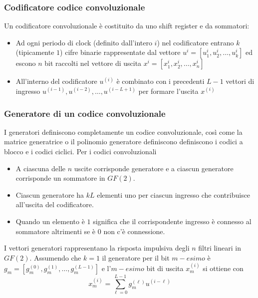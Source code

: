         \subsubsection{Codificatore codice convoluzionale}
            Un codificatore convoluzionale è costituito da uno shift register e da sommatori: 
            \begin{itemize}
                \item {
                    \begin{sloppypar}
                        Ad ogni periodo di clock (definito dall'intero $i$) nel codificatore entrano $k$ (tipicamente $1$) cifre binarie 
                        rappresentate dal vettore ${u^{i} = [u^{i}_1,u^{i}_2,\dots,u^{i}_k]}$ ed escono $n$ bit raccolti nel vettore di uscita
                        ${x^{i} = [x^{i}_1,x^{i}_2,\dots,x^{i}_n]}$
                    \end{sloppypar}
                }
                \item {
                    All'interno del codificatore $u^{(i)}$ è combinato con i precedenti $L-1$ vettori di ingresso $u^{(i-1)},u^{(i-2)},\dots,u^{(i-L+1)}$
                    per formare l'uscita $x^{(i)}$
                }
            \end{itemize}
        \subsubsection{Generatore di un codice convoluzionale}
            I generatori definiscono completamente un codice convoluzionale, così come la matrice generatrice o il polinomio generatore definiscono
            definiscono i codici a blocco e i codici ciclici. Per i codici convoluzionali 
            \begin{itemize}
                \item {
                    A ciascuna delle $n$ uscite corrisponde generatore e a ciascun generatore corrisponde un sommatore in $GF(2)$.
                }
                \item {
                    Ciascun generatore ha $kL$ elementi uno per ciascun ingresso che contribuisce all'uscita del codificatore.
                }
                \item {
                    Quando un elemento è $1$ significa che il corrispondente ingresso è connesso al sommatore altrimenti se è $0$
                    non c'è connessione.
                }
            \end{itemize}
            I vettori generatori rappresentano la risposta impulsiva degli $n$ filtri lineari in $GF(2)$. Assumendo che $k=1$ il 
            generatore per il bit $m-esimo$ è $g_m = [g^{(0)}_m,g^{(1)}_m,\dots,g^{(L-1)}_m]$ e l'$m-esimo$ bit di uscita $x^{(i)}_m$ 
            si ottiene con 
            \[
                x_m^{(i)} = \sum_{\ell = 0}^{L-1} g_m^{(\ell)}u^{(i-\ell)}  
            \]
